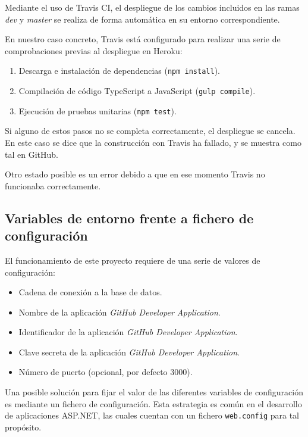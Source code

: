 Mediante el uso de Travis CI, el despliegue de los cambios incluidos en las ramas \textit{dev} y \textit{master} se realiza de forma automática en su entorno correspondiente.


En nuestro caso concreto, Travis está configurado para realizar una serie de comprobaciones previas al despliegue en Heroku:

\begin{enumerate}
	\item Descarga e instalación de dependencias (\texttt{npm install}).
	\item Compilación de código TypeScript a JavaScript (\texttt{gulp compile}).
	\item Ejecución de pruebas unitarias (\texttt{npm test}).
\end{enumerate}

Si alguno de estos pasos no se completa correctamente, el despliegue se cancela. En este caso se dice que la construcción con Travis ha fallado, y se muestra como tal en GitHub.

Otro estado posible es un error debido a que en ese momento Travis no funcionaba correctamente.


\subsection{Variables de entorno frente a fichero de configuración}

El funcionamiento de este proyecto requiere de una serie de valores de configuración:

\begin{itemize}
	\item Cadena de conexión a la base de datos.
	\item Nombre de la aplicación \textit{GitHub Developer Application}.
	\item Identificador de la aplicación \textit{GitHub Developer Application}.
	\item Clave secreta de la aplicación \textit{GitHub Developer Application}.
	\item Número de puerto (opcional, por defecto 3000).
\end{itemize}

Una posible solución para fijar el valor de las diferentes variables de configuración es mediante un fichero de configuración. Esta estrategia es común en el desarrollo de aplicaciones ASP.NET, las cuales cuentan con un fichero \texttt{web.config} para tal propósito.

